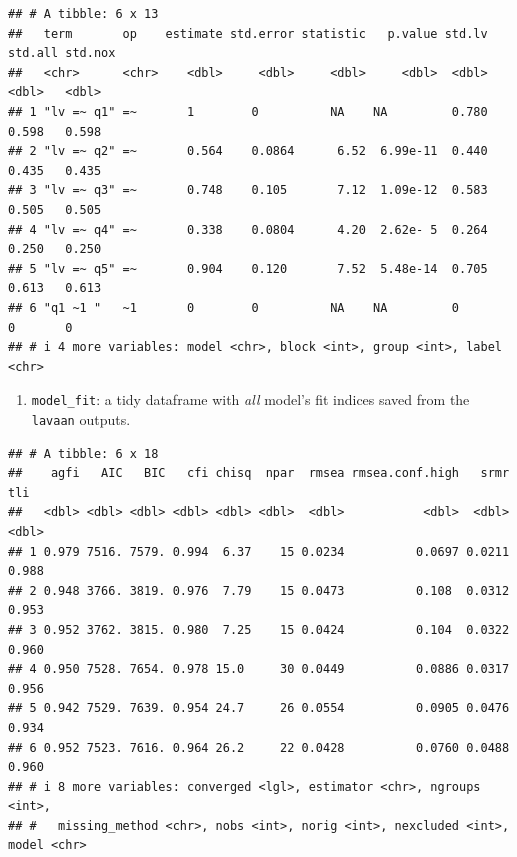 \documentclass[
  man]{apa6}
\newenvironment{Shaded}{\begin{snugshade}}{\end{snugshade}}
\newcommand{\FunctionTok}[1]{\textcolor[rgb]{0.00,0.00,0.00}{#1}}
\newcommand{\NormalTok}[1]{#1}
\newcommand{\SpecialCharTok}[1]{\textcolor[rgb]{0.00,0.00,0.00}{#1}}
\providecommand{\tightlist}{%
  \setlength{\itemsep}{0pt}\setlength{\parskip}{0pt}}
\begin{document}
\normalsize

\begin{verbatim}
## # A tibble: 6 x 13
##   term       op    estimate std.error statistic   p.value std.lv std.all std.nox
##   <chr>      <chr>    <dbl>     <dbl>     <dbl>     <dbl>  <dbl>   <dbl>   <dbl>
## 1 "lv =~ q1" =~       1        0          NA    NA         0.780   0.598   0.598
## 2 "lv =~ q2" =~       0.564    0.0864      6.52  6.99e-11  0.440   0.435   0.435
## 3 "lv =~ q3" =~       0.748    0.105       7.12  1.09e-12  0.583   0.505   0.505
## 4 "lv =~ q4" =~       0.338    0.0804      4.20  2.62e- 5  0.264   0.250   0.250
## 5 "lv =~ q5" =~       0.904    0.120       7.52  5.48e-14  0.705   0.613   0.613
## 6 "q1 ~1 "   ~1       0        0          NA    NA         0       0       0    
## # i 4 more variables: model <chr>, block <int>, group <int>, label <chr>
\end{verbatim}

\begin{enumerate}
\def\labelenumi{\arabic{enumi})}
\setcounter{enumi}{1}
\tightlist
\item
  \texttt{model\_fit}: a tidy dataframe with \emph{all} model's fit indices saved from the \texttt{lavaan} outputs.
\end{enumerate}

\small

\begin{Shaded}
\end{Shaded}

\normalsize

\begin{verbatim}
## # A tibble: 6 x 18
##    agfi   AIC   BIC   cfi chisq  npar  rmsea rmsea.conf.high   srmr   tli
##   <dbl> <dbl> <dbl> <dbl> <dbl> <dbl>  <dbl>           <dbl>  <dbl> <dbl>
## 1 0.979 7516. 7579. 0.994  6.37    15 0.0234          0.0697 0.0211 0.988
## 2 0.948 3766. 3819. 0.976  7.79    15 0.0473          0.108  0.0312 0.953
## 3 0.952 3762. 3815. 0.980  7.25    15 0.0424          0.104  0.0322 0.960
## 4 0.950 7528. 7654. 0.978 15.0     30 0.0449          0.0886 0.0317 0.956
## 5 0.942 7529. 7639. 0.954 24.7     26 0.0554          0.0905 0.0476 0.934
## 6 0.952 7523. 7616. 0.964 26.2     22 0.0428          0.0760 0.0488 0.960
## # i 8 more variables: converged <lgl>, estimator <chr>, ngroups <int>,
## #   missing_method <chr>, nobs <int>, norig <int>, nexcluded <int>, model <chr>
\end{verbatim}
\end{document}
